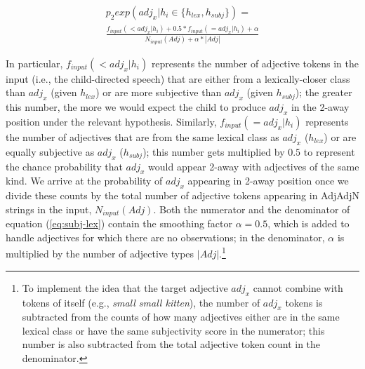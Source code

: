 \documentclass[10pt]{article}
\newcommand{\gcs}[1]{\textcolor{blue}{[gcs: #1]}}
\newcommand{\gkb}[1]{\textcolor{magenta}{[gkb: #1]}}
\newcommand{\lsp}[1]{\textcolor{violet}{[lsp: #1]}}
\begin{document}
\vspace{-15pt}

\begin{multline} %
\label{eq:subj-lex}
p_2exp(adj_x|h_i \in \{h_{lex}, h_{subj}\})  =  \\
 \frac{f_{input}(<adj_x|h_i) + 0.5*f_{input}(=adj_x|h_i) +\alpha}{N_{input}(Adj) +\alpha*|Adj|}
\end{multline}

In particular, $f_{input}(<adj_x|h_i)$ represents the number of adjective tokens in the input (i.e., the child-directed speech) that are either from a lexically-closer class than $adj_x$ (given $h_{lex}$) or are more subjective than $adj_x$ (given $h_{subj}$); the greater this number, the more we would expect the child to produce $adj_x$ in the 2-away position under the relevant hypothesis. Similarly, $f_{input}(=adj_x|h_i)$ represents the number of adjectives that are from the same lexical class as $adj_x$ ($h_{lex}$) or are equally subjective as $adj_x$ ($h_{subj}$); this number gets multiplied by $0.5$ to represent the chance probability that $adj_x$ would appear 2-away with adjectives of the same kind. We arrive at the probability of $adj_x$ appearing in 2-away position once we divide these counts by the total number of adjective tokens appearing in AdjAdjN strings in the input, $N_{input}(Adj)$. Both the numerator and the denominator of equation (\ref{eq:subj-lex}) contain the smoothing factor $\alpha = 0.5$, which is added to handle adjectives for which there are no observations; in the denominator, $\alpha$ is multiplied by the number of adjective types $|Adj|$.\footnote{
To implement the idea that the target adjective $adj_x$ cannot combine with tokens of itself 
(e.g., \textit{small small kitten}), the number of $adj_x$ tokens 
is subtracted from the counts of how many adjectives either are in the same lexical class or have the same subjectivity score in the numerator; this number is also subtracted from the total adjective token count in the denominator. 
}
\end{document}
